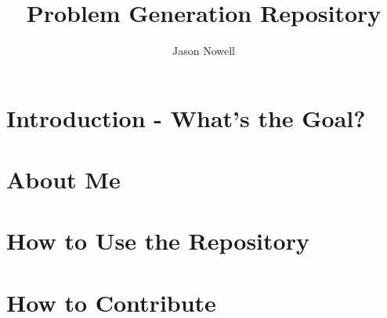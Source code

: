 \documentclass{article}
\title{Problem Generation Repository}
\author{Jason Nowell}
\begin{document}
\maketitle

\tableofcontents

\section{Introduction - What's the Goal?}


\section{About Me}


\section{How to Use the Repository}


\section{How to Contribute}
\end{document}
